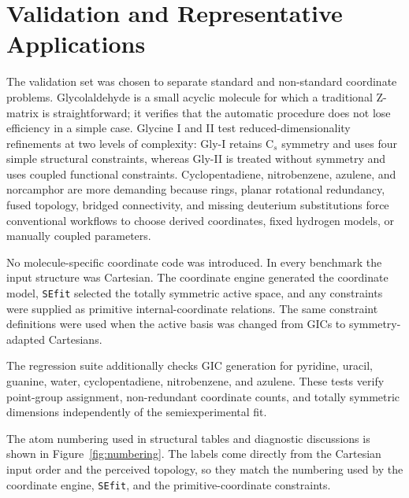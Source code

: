 \documentclass[journal=jctcce,manuscript=article,maxauthors=999]{achemso}
\begin{document}
\section{Validation and Representative Applications}

The validation set was chosen to separate standard and non-standard coordinate
problems. Glycolaldehyde is a small acyclic molecule for which a traditional
Z-matrix is straightforward; it verifies that the automatic procedure does not
lose efficiency in a simple case. Glycine I and II test reduced-dimensionality
refinements at two levels of complexity: Gly-I retains C$_s$ symmetry and uses
four simple structural constraints, whereas Gly-II is treated without symmetry
and uses coupled functional constraints. Cyclopentadiene, nitrobenzene,
azulene, and norcamphor are more demanding because rings,
planar rotational redundancy, fused topology, bridged connectivity, and
missing deuterium substitutions force conventional workflows to choose derived
coordinates, fixed hydrogen models, or manually coupled parameters.

No molecule-specific coordinate code was introduced. In every benchmark the
input structure was Cartesian. The coordinate engine generated the coordinate
model, \texttt{SEfit} selected the totally symmetric active space, and any
constraints were supplied as primitive internal-coordinate relations. The same
constraint definitions were used when the active basis was changed from GICs
to symmetry-adapted Cartesians.

The regression suite additionally checks GIC generation for pyridine, uracil,
guanine, water, cyclopentadiene, nitrobenzene, and azulene. These tests verify point-group
assignment, non-redundant coordinate counts, and totally symmetric dimensions
independently of the semiexperimental fit.

The atom numbering used in structural tables and diagnostic discussions is
shown in Figure~\ref{fig:numbering}. The labels come directly from the
Cartesian input order and the perceived topology, so they match the numbering
used by the coordinate engine, \texttt{SEfit}, and the primitive-coordinate
constraints.
\end{document}
